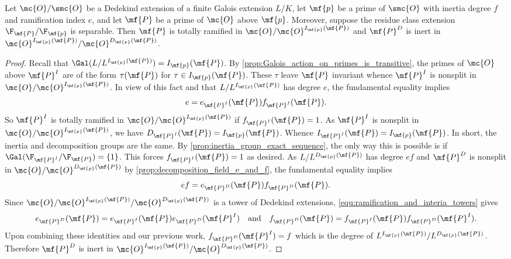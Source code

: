     \begin{proposition}\label{prop:inertia_field_e_and_f}
      Let \(\mc{O}/\smc{O}\) be a Dedekind extension of a finite Galois extension \(L/K\), let \(\mf{p}\) be a prime of \(\smc{O}\) with inertia degree \(f\) and ramification index \(e\), and let \(\mf{P}\) be a prime of \(\mc{O}\) above \(\mf{p}\). Moreover, suppose the residue class extension \(\F_{\mf{P}}/\F_{\mf{p}}\) is separable. Then \(\mf{P}\) is totally ramified in \(\mc{O}/\mc{O}^{I_{\mf{p}}(\mf{P})}\) and \(\mf{P}^{D}\) is inert in \(\mc{O}^{I_{\mf{p}}(\mf{P})}/\mc{O}^{D_{\mf{p}}(\mf{P})}\).
    \end{proposition}
    \begin{proof}
      Recall that \(\Gal(L/L^{I_{\mf{p}}(\mf{P})}) = I_{\mf{p}}(\mf{P})\). By \cref{prop:Galois_action_on_primes_is_transitive}, the primes of \(\mc{O}\) above \(\mf{P}^{I}\) are of the form \(\tau(\mf{P})\) for \(\tau \in I_{\mf{p}}(\mf{P})\). These \(\tau\) leave \(\mf{P}\) invariant whence \(\mf{P}^{I}\) is nonsplit in \(\mc{O}/\mc{O}^{I_{\mf{p}}(\mf{P})}\). In view of this fact and that \(L/L^{I_{\mf{p}}(\mf{P})}\) has degree \(e\), the fundamental equality implies
      \[
        e = e_{\mf{P}^{I}}(\mf{P})f_{\mf{P}^{I}}(\mf{P}).
      \]
      So \(\mf{P}^{I}\) is totally ramified in \(\mc{O}/\mc{O}^{I_{\mf{p}}(\mf{P})}\) if \(f_{\mf{P}^{I}}(\mf{P}) = 1\). As \(\mf{P}^{I}\) is nonsplit in \(\mc{O}/\mc{O}^{I_{\mf{p}}(\mf{P})}\), we have \(D_{\mf{P}^{I}}(\mf{P}) = I_{\mf{p}}(\mf{P})\). Whence \(I_{\mf{P}^{I}}(\mf{P}) = I_{\mf{p}}(\mf{P})\). In short, the inertia and decomposition groups are the same. By \cref{prop:inertia_group_exact_sequence}, the only way this is possible is if \(\Gal(\F_{\mf{P}^{I}}/\F_{\mf{P}}) = \{1\}\). This forces \(f_{\mf{P}^{I}}(\mf{P}) = 1\) as desired. As \(L/L^{D_{\mf{p}}(\mf{P})}\) has degree \(ef\) and \(\mf{P}^{D}\) is nonsplit in \(\mc{O}/\mc{O}^{D_{\mf{p}}(\mf{P})}\) by \cref{prop:decomposition_field_e_and_f}, the fundamental equality implies
      \[
        ef = e_{\mf{P}^{D}}(\mf{P})f_{\mf{P}^{D}}(\mf{P}).
      \]
      Since \(\mc{O}/\mc{O}^{I_{\mf{p}}(\mf{P})}/\mc{O}^{D_{\mf{p}}(\mf{P})}\) is a tower of Dedekind extensions, \cref{equ:ramification_and_interia_towers} gives
      \[
        e_{\mf{P}^{D}}(\mf{P}) = e_{\mf{P}^{I}}(\mf{P})e_{\mf{P}^{D}}(\mf{P}^{I}) \quad \text{and} \quad f_{\mf{P}^{D}}(\mf{P}) = f_{\mf{P}^{I}}(\mf{P})f_{\mf{P}^{D}}(\mf{P}^{I}).
      \]
      Upon combining these identities and our previous work, \(f_{\mf{P}^{D}}(\mf{P}^{I}) = f\) which is the degree of \(L^{I_{\mf{p}}(\mf{P})}/L^{D_{\mf{p}}(\mf{P})}\). Therefore \(\mf{P}^{D}\) is inert in \(\mc{O}^{I_{\mf{p}}(\mf{P})}/\mc{O}^{D_{\mf{p}}(\mf{P})}\).
    \end{proof}

